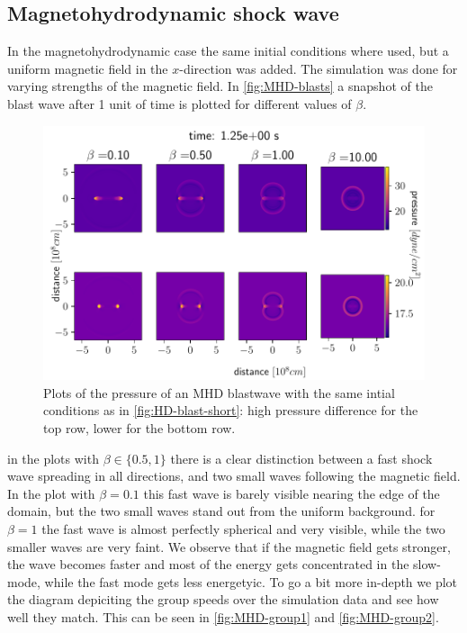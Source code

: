 \subsection{Magnetohydrodynamic shock wave}
In the magnetohydrodynamic case the same initial conditions where used, but a uniform magnetic field in the $x$-direction was added. The simulation was done for varying strengths of the magnetic field.
In \autoref{fig:MHD-blasts} a snapshot of the blast wave after 1 unit of time is plotted for different values of $\beta$.

\begin{figure}[H]
	\centering
	\includegraphics[width=\linewidth]{images/MHD-blasts.pdf}
	\caption{Plots of the pressure of an MHD blastwave with the same intial conditions as in \autoref{fig:HD-blast-short}: high pressure difference for the top row, lower for the bottom row.}
	\label{fig:MHD-blasts}
\end{figure}
in the plots with $\beta \in \{0.5,1\}$ there is a clear distinction between a fast shock wave spreading in all directions, and two small waves following the magnetic field.
In the plot with $\beta=0.1$ this fast wave is barely visible nearing the edge of the domain, but the two small waves stand out from the uniform background.
for $\beta=1$ the fast wave is almost perfectly spherical and very visible, while the two smaller waves are very faint.
We observe that if the magnetic field gets stronger, the wave becomes faster and most of the energy gets concentrated in the slow-mode, while the fast mode gets less energetyic. 
To go a bit more in-depth we plot the diagram depiciting the group speeds over the simulation data and see how well they match. This can be seen in \autoref{fig:MHD-group1} and \autoref{fig:MHD-group2}.

